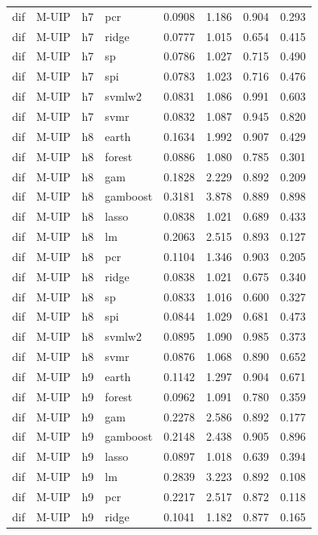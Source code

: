 \begin{ThreePartTable}
\begin{longtable}[t]{llclcccc}
dif & M-UIP & h7 & pcr & 0.0908 & 1.186 & 0.904 & 0.293\\
dif & M-UIP & h7 & ridge & 0.0777 & 1.015 & 0.654 & 0.415\\
dif & M-UIP & h7 & sp & 0.0786 & 1.027 & 0.715 & 0.490\\
dif & M-UIP & h7 & spi & 0.0783 & 1.023 & 0.716 & 0.476\\
dif & M-UIP & h7 & svmlw2 & 0.0831 & 1.086 & 0.991 & 0.603\\
dif & M-UIP & h7 & svmr & 0.0832 & 1.087 & 0.945 & 0.820\\
\addlinespace
dif & M-UIP & h8 & earth & 0.1634 & 1.992 & 0.907 & 0.429\\
dif & M-UIP & h8 & forest & 0.0886 & 1.080 & 0.785 & 0.301\\
dif & M-UIP & h8 & gam & 0.1828 & 2.229 & 0.892 & 0.209\\
dif & M-UIP & h8 & gamboost & 0.3181 & 3.878 & 0.889 & 0.898\\
dif & M-UIP & h8 & lasso & 0.0838 & 1.021 & 0.689 & 0.433\\
dif & M-UIP & h8 & lm & 0.2063 & 2.515 & 0.893 & 0.127\\
dif & M-UIP & h8 & pcr & 0.1104 & 1.346 & 0.903 & 0.205\\
dif & M-UIP & h8 & ridge & 0.0838 & 1.021 & 0.675 & 0.340\\
dif & M-UIP & h8 & sp & 0.0833 & 1.016 & 0.600 & 0.327\\
dif & M-UIP & h8 & spi & 0.0844 & 1.029 & 0.681 & 0.473\\
dif & M-UIP & h8 & svmlw2 & 0.0895 & 1.090 & 0.985 & 0.373\\
dif & M-UIP & h8 & svmr & 0.0876 & 1.068 & 0.890 & 0.652\\
\addlinespace
dif & M-UIP & h9 & earth & 0.1142 & 1.297 & 0.904 & 0.671\\
dif & M-UIP & h9 & forest & 0.0962 & 1.091 & 0.780 & 0.359\\
dif & M-UIP & h9 & gam & 0.2278 & 2.586 & 0.892 & 0.177\\
dif & M-UIP & h9 & gamboost & 0.2148 & 2.438 & 0.905 & 0.896\\
dif & M-UIP & h9 & lasso & 0.0897 & 1.018 & 0.639 & 0.394\\
dif & M-UIP & h9 & lm & 0.2839 & 3.223 & 0.892 & 0.108\\
dif & M-UIP & h9 & pcr & 0.2217 & 2.517 & 0.872 & 0.118\\
dif & M-UIP & h9 & ridge & 0.1041 & 1.182 & 0.877 & 0.165\\

\end{longtable}
\end{ThreePartTable}
